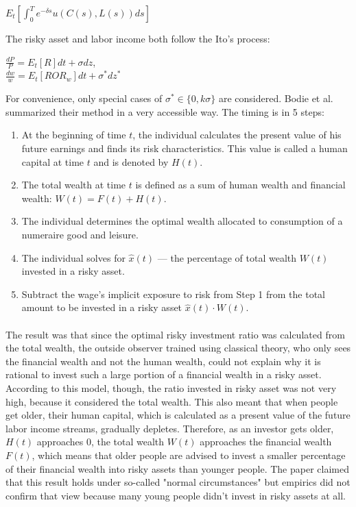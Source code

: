 \documentclass[]{article}
\begin{document}
\begin{center}
	$E_t \left[\displaystyle\int_0^T e^{-\delta s} u(C(s), L(s))ds \right]$
\end{center}

The risky asset and labor income both follow the Ito's process:

\begin{center}
	$\frac{dP}{P} = E_t[R]dt + \sigma dz$,\\
	$\frac{dw}{w} = E_t[ROR_w]dt + \sigma^* dz^*$
\end{center}

For convenience, only special cases of $\sigma^* \in \{0, k\sigma \}$ are considered. Bodie et al. summarized their method in a very accessible way. The timing is in 5 steps:

\begin{enumerate}
	\item At the beginning of time $t$, the individual calculates the present value of his future earnings and finds its risk characteristics. This value is called a human capital at time $t$ and is denoted by $H(t)$.
	\item The total wealth at time $t$ is defined as a sum of human wealth and financial wealth: $W(t) = F(t) + H(t)$.
	\item The individual determines the optimal wealth allocated to consumption of a numeraire good and leisure.
	\item The individual solves for $\hat{x}(t)$ --- the percentage of total wealth $W(t)$ invested in a risky asset.
	\item Subtract the wage's implicit exposure to risk from Step 1 from the total amount to be invested in a risky asset $\hat{x}(t) \cdot W(t)$.
\end{enumerate}

\paragraph*{}The result was that since the optimal risky investment ratio was calculated from the total wealth, the outside observer trained using classical theory, who only sees the financial wealth and not the human wealth, could not explain why it is rational to invest such a large portion of a financial wealth in a risky asset. According to this model, though, the ratio invested in risky asset was not very high, because it considered the total wealth. This also meant that when people get older, their human capital, which is calculated as a present value of the future labor income streams, gradually depletes. Therefore, as an investor gets older, $H(t)$ approaches $0$, the total wealth $W(t)$ approaches the financial wealth $F(t)$, which means that older people are advised to invest a smaller percentage of their financial wealth into risky assets than younger people. The paper claimed that this result holds under so-called "normal circumstances" but empirics did not confirm that view because many young people didn't invest in risky assets at all. 
\end{document}
